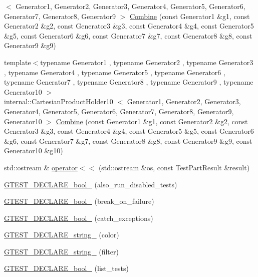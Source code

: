 \begin{DoxyCompactItemize}
$<$ \-Generator1, \-Generator2, \*
\-Generator3, \-Generator4, \*
\-Generator5, \-Generator6, \*
\-Generator7, \-Generator8, \*
\-Generator9 $>$ \hyperlink{namespacetesting_a928ed7d1e8dd1dde0da5d7d3838384d2}{\-Combine} (const \-Generator1 \&g1, const \-Generator2 \&g2, const \-Generator3 \&g3, const \-Generator4 \&g4, const \-Generator5 \&g5, const \-Generator6 \&g6, const \-Generator7 \&g7, const \-Generator8 \&g8, const \-Generator9 \&g9)
\item 
{\footnotesize template$<$typename Generator1 , typename Generator2 , typename Generator3 , typename Generator4 , typename Generator5 , typename Generator6 , typename Generator7 , typename Generator8 , typename Generator9 , typename Generator10 $>$ }\\internal\-::\-Cartesian\-Product\-Holder10\*
$<$ \-Generator1, \-Generator2, \*
\-Generator3, \-Generator4, \*
\-Generator5, \-Generator6, \*
\-Generator7, \-Generator8, \*
\-Generator9, \-Generator10 $>$ \hyperlink{namespacetesting_a0590cd15c5bafaea9f5d2b1061e0a28b}{\-Combine} (const \-Generator1 \&g1, const \-Generator2 \&g2, const \-Generator3 \&g3, const \-Generator4 \&g4, const \-Generator5 \&g5, const \-Generator6 \&g6, const \-Generator7 \&g7, const \-Generator8 \&g8, const \-Generator9 \&g9, const \-Generator10 \&g10)
\item 
std\-::ostream \& \hyperlink{namespacetesting_ae8b6df347210c0ebfe5ec995d03c7aed}{operator$<$$<$} (std\-::ostream \&os, const \-Test\-Part\-Result \&result)
\item 
\hyperlink{namespacetesting_a1619f71d188a47c933c9563477c6cebf}{\-G\-T\-E\-S\-T\-\_\-\-D\-E\-C\-L\-A\-R\-E\-\_\-bool\-\_\-} (also\-\_\-run\-\_\-disabled\-\_\-tests)
\item 
\hyperlink{namespacetesting_a25fe4ea2fa2de9858abfaa1383892f90}{\-G\-T\-E\-S\-T\-\_\-\-D\-E\-C\-L\-A\-R\-E\-\_\-bool\-\_\-} (break\-\_\-on\-\_\-failure)
\item 
\hyperlink{namespacetesting_a6268f547a89a044ff6158fbfa0cab5cc}{\-G\-T\-E\-S\-T\-\_\-\-D\-E\-C\-L\-A\-R\-E\-\_\-bool\-\_\-} (catch\-\_\-exceptions)
\item 
\hyperlink{namespacetesting_ade7e561db85a5c2b87e9f0f66d4a4363}{\-G\-T\-E\-S\-T\-\_\-\-D\-E\-C\-L\-A\-R\-E\-\_\-string\-\_\-} (color)
\item 
\hyperlink{namespacetesting_a4c624a5efd425b1d1ec252507716c9e4}{\-G\-T\-E\-S\-T\-\_\-\-D\-E\-C\-L\-A\-R\-E\-\_\-string\-\_\-} (filter)
\item 
\hyperlink{namespacetesting_a503777cea079ba5720eaa67cc4bcf352}{\-G\-T\-E\-S\-T\-\_\-\-D\-E\-C\-L\-A\-R\-E\-\_\-bool\-\_\-} (list\-\_\-tests)

\end{DoxyCompactItemize}
